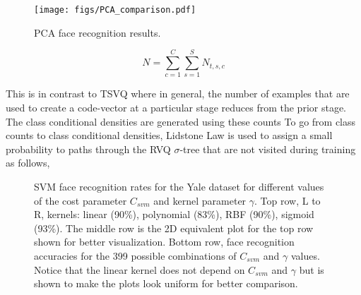 \begin{enumerate}
\begin{enumerate}
											\begin{figure}[t]
											\center
											\texttt{[image: figs/PCA\_comparison.pdf]}
											\caption{PCA face recognition results.}
											\label{fig:PCA_yaleface_results}
											\end{figure}


\begin{equation}
N = \sum\limits_{c=1}^C\sum\limits_{s=1}^{S} N_{t,s,c}
\end{equation}

This is in contrast to TSVQ where in general, the number of examples that are used to create a  code-vector at a particular stage reduces from the prior stage.  The class conditional densities are generated using these counts
To go from class counts to class conditional densities, Lidstone Law is used to assign a small probability to paths through the RVQ $\sigma$-tree that are not visited during training as follows,

									\begin{figure}[t]
									\centering
									\caption{SVM face recognition rates for the Yale dataset for different values of the cost parameter $C_{svm}$ and kernel parameter $\gamma$.  Top row, L to R, kernels: linear (90\%), polynomial (83\%), RBF (90\%), sigmoid (93\%).  The middle row is the 2D equivalent plot for the top row shown for better visualization.  Bottom row, face recognition accuracies for the 399 possible combinations of $C_{svm}$ and $\gamma$ values.  Notice that the linear kernel does not depend on $C_{svm}$ and $\gamma$ but is shown to make the plots look uniform for better comparison.}
									\label{fig:SVM_yaleface_results}
									\end{figure}




\end{enumerate}
\end{enumerate}
